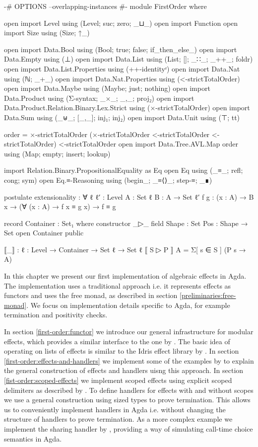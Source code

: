 \begin{code}[hide]
{-# OPTIONS --overlapping-instances #-}
module FirstOrder where

open import Level using (Level; suc; zero; _⊔_)
open import Function
open import Size using (Size; ↑_)

open import Data.Bool using (Bool; true; false; if_then_else_)
open import Data.Empty using (⊥)
open import Data.List using (List; []; _∷_; _++_; foldr)
open import Data.List.Properties using (++-identityʳ)
open import Data.Nat using (ℕ; _+_)
open import Data.Nat.Properties using (<-strictTotalOrder)
open import Data.Maybe using (Maybe; just; nothing)
open import Data.Product using (Σ-syntax; _×_; _,_; proj₂)
open import Data.Product.Relation.Binary.Lex.Strict using (×-strictTotalOrder)
open import Data.Sum using (_⊎_; [_,_]; inj₁; inj₂)
open import Data.Unit using (⊤; tt)

order = ×-strictTotalOrder (×-strictTotalOrder <-strictTotalOrder <-strictTotalOrder) <-strictTotalOrder
open import Data.Tree.AVL.Map order using (Map; empty; insert; lookup)

import Relation.Binary.PropositionalEquality as Eq
open Eq using (_≡_; refl; cong; sym)
open Eq.≡-Reasoning using (begin_; _≡⟨⟩_; step-≡; _∎)

postulate
  extensionality : ∀ {ℓ ℓ′ : Level} {A : Set ℓ} {B : A → Set ℓ′} {f g : (x : A) → B x}
      → (∀ (x : A) → f x ≡ g x) → f ≡ g

record Container : Set₁ where
  constructor _▷_
  field
    Shape : Set
    Pos : Shape → Set
open Container public

⟦_⟧ : {ℓ : Level} → Container → Set ℓ → Set ℓ
⟦ S ▷ P ⟧ A = Σ[ s ∈ S ] (P s → A)
\end{code}

In this chapter we present our first implementation of algebraic effects in Agda.
The implementation uses a traditional approach i.e. it represents effects as
functors and uses the free monad, as described in section
\ref{preliminaries:free-monad}.
We focus on implementation details specific to Agda, for example termination and
positivity checks.

In section \ref{first-order:functor} we introduce our general infrastructure for
modular effects, which provides a similar interface to the one by
\textcite{DBLP:conf/haskell/WuSH14}.
The basic idea of operating on lists of effects is similar to the Idris effect
library by \textcite{DBLP:conf/icfp/Brady13}.
In section \ref{first-order:effects-and-handlers} we implement some of the
examples by \textcite{DBLP:conf/haskell/WuSH14} to explain the general
construction of effects and handlers uisng this approach.
In section \ref{fist-order:scoped-effects} we implement scoped effects using
explicit scoped delimiters as described by \textcite{DBLP:conf/haskell/WuSH14}.
To define handlers for effects with and without scopes we use a general
construction using sized types to prove termination.
This allows us to conveniently implement handlers in Agda i.e. without changing
the structure of handlers to prove termination.
As a more complex example we implement the sharing handler by
\textcite{bunkenburg2019modeling}, providing a way of simulating call-time
choice semantics in Agda.


